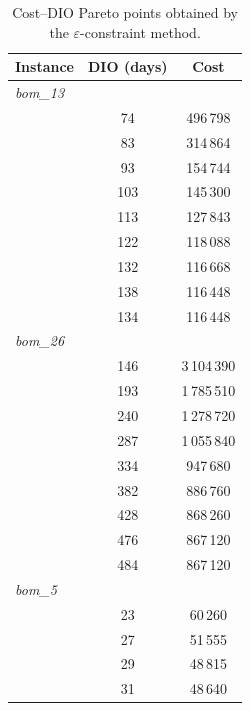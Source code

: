 \begin{table}[!htbp]\centering\small
\caption{Cost--DIO Pareto points obtained by the $\varepsilon$-constraint method.}\label{tab:paretodio}
\begin{tabular}{lcc}
\toprule
Instance & DIO (days) & Cost\\
\midrule
\multicolumn{3}{l}{\textit{bom\_13}} \\
 & 74 & 496\,798 \\
 & 83 & 314\,864 \\
 & 93 & 154\,744 \\
 & 103 & 145\,300 \\
 & 113 & 127\,843 \\
 & 122 & 118\,088 \\
 & 132 & 116\,668 \\
 & 138 & 116\,448 \\
 & 134 & 116\,448 \\
\midrule
\multicolumn{3}{l}{\textit{bom\_26}} \\
 & 146 & 3\,104\,390 \\
 & 193 & 1\,785\,510 \\
 & 240 & 1\,278\,720 \\
 & 287 & 1\,055\,840 \\
 & 334 & 947\,680 \\
 & 382 & 886\,760 \\
 & 428 & 868\,260 \\
 & 476 & 867\,120 \\
 & 484 & 867\,120 \\
\midrule
\multicolumn{3}{l}{\textit{bom\_5}} \\
 & 23 & 60\,260 \\
 & 27 & 51\,555 \\
 & 29 & 48\,815 \\
 & 31 & 48\,640 \\
\bottomrule
\end{tabular}
\end{table}
